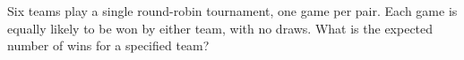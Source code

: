 Six teams play a single round-robin tournament, one game per pair. Each game is equally likely to be won by either team, with no draws. What is the expected number of wins for a specified team?
